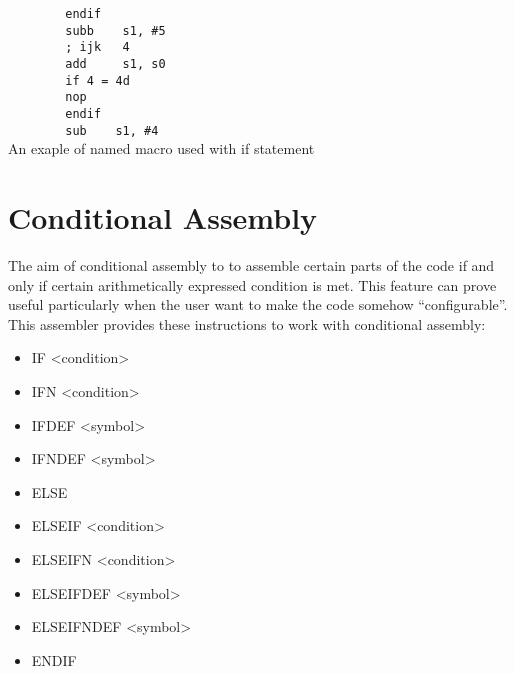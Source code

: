 \begin{code}[h!]
            \verb'        '{\color{highlight_directive}\verb'endif'}\\
            \verb'        '{\color{highlight_instruction}\verb'subb'}\verb'    '{\color{highlight_sfr}\verb's1'}{\color{highlight_oper_sep}\verb','}\verb' '{\color{highlight_imm_unknown}\verb'#5'}\\
            \verb'        '{\color{highlight_comment}\verb'; ijk   4'}\\
            \verb'        '{\color{highlight_instruction}\verb'add'}\verb'     '{\color{highlight_sfr}\verb's1'}{\color{highlight_oper_sep}\verb','}\verb' '{\color{highlight_indirect}\verb's0'}\\
            \verb'        '{\color{highlight_directive}\verb'if'}\verb' '{\color{highlight_unknown_base}\verb'4'}\verb' '{\color{highlight_symbol}\verb'='}\verb' '{\color{highlight_dec}\verb'4d'}\\
            \verb'        '{\color{highlight_instruction}\verb'nop'}\\
            \verb'        '{\color{highlight_directive}\verb'endif'}\\
            \verb'        '{\color{highlight_instruction}\verb'sub'}\verb'    '{\color{highlight_sfr}\verb's1'}{\color{highlight_oper_sep}\verb','}\verb' '{\color{highlight_imm_unknown}\verb'#4'}\\
            \caption{An exaple of named macro used with if statement}
    \end{code}

\section{Conditional Assembly}
        The aim of conditional assembly to to assemble certain parts of the code if and only if certain arithmetically expressed condition is met.
        This feature can prove useful particularly when the user want to make the code somehow ``configurable''. This assembler provides these instructions
        to work with conditional assembly:
        \begin{itemize}
                \setlength{\itemsep}{-3pt}
                \item IF <condition>
                \item IFN <condition>
                \item IFDEF <symbol>
                \item IFNDEF <symbol>
                \item ELSE
                \item ELSEIF <condition>
                \item ELSEIFN <condition>
                \item ELSEIFDEF <symbol>
                \item ELSEIFNDEF <symbol>
                \item ENDIF
        \end{itemize}

